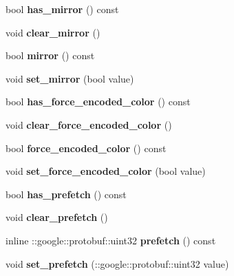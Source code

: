 \begin{DoxyCompactItemize}
bool {\bfseries has\+\_\+mirror} () const
\item 
\mbox{\label{classcaffe_1_1_data_parameter_a2e99b33989b78461851965c8322b7488}} 
void {\bfseries clear\+\_\+mirror} ()
\item 
\mbox{\label{classcaffe_1_1_data_parameter_a94453b612f470401037f0885f9dc1fbc}} 
bool {\bfseries mirror} () const
\item 
\mbox{\label{classcaffe_1_1_data_parameter_af7ac491447893bd665ea6217cf63f40b}} 
void {\bfseries set\+\_\+mirror} (bool value)
\item 
\mbox{\label{classcaffe_1_1_data_parameter_a781c2314f51469045db9b64a1f77d39e}} 
bool {\bfseries has\+\_\+force\+\_\+encoded\+\_\+color} () const
\item 
\mbox{\label{classcaffe_1_1_data_parameter_ad9b0d37dea5582448ea17543399402a1}} 
void {\bfseries clear\+\_\+force\+\_\+encoded\+\_\+color} ()
\item 
\mbox{\label{classcaffe_1_1_data_parameter_a4990a06b541b42550ba2928ed7dc1788}} 
bool {\bfseries force\+\_\+encoded\+\_\+color} () const
\item 
\mbox{\label{classcaffe_1_1_data_parameter_a30f21a510800d1a2cf2c2a83a21cd4de}} 
void {\bfseries set\+\_\+force\+\_\+encoded\+\_\+color} (bool value)
\item 
\mbox{\label{classcaffe_1_1_data_parameter_af24a8d8a085664f536490049e57cd34a}} 
bool {\bfseries has\+\_\+prefetch} () const
\item 
\mbox{\label{classcaffe_1_1_data_parameter_a71884bf55a29257cc94b69b869f7aff2}} 
void {\bfseries clear\+\_\+prefetch} ()
\item 
\mbox{\label{classcaffe_1_1_data_parameter_aa72f3debeaec69735e74d17baccfd038}} 
inline \+::google\+::protobuf\+::uint32 {\bfseries prefetch} () const
\item 
\mbox{\label{classcaffe_1_1_data_parameter_a6b8ce9ae95d729c69d9fbdb92b59ffd1}} 
void {\bfseries set\+\_\+prefetch} (\+::google\+::protobuf\+::uint32 value)
\end{DoxyCompactItemize}
